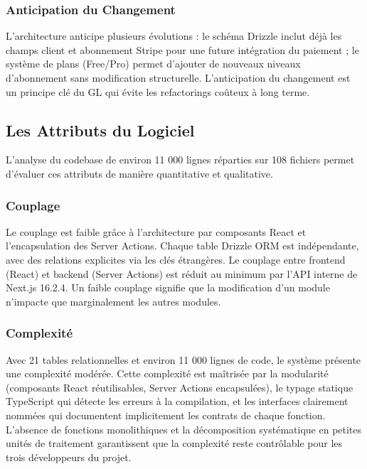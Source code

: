 \subsubsection{Anticipation du Changement}

L'architecture anticipe plusieurs évolutions : le schéma Drizzle inclut déjà les champs client et abonnement Stripe pour une future intégration du paiement ; le système de plans (Free/Pro) permet d'ajouter de nouveaux niveaux d'abonnement sans modification structurelle. L'anticipation du changement est un principe clé du GL qui évite les refactorings coûteux à long terme.

\subsection{Les Attributs du Logiciel}

L'analyse du codebase de environ 11 000 lignes réparties sur 108 fichiers permet d'évaluer ces attributs de manière quantitative et qualitative.

\subsubsection{Couplage}

Le couplage est faible grâce à l'architecture par composants React et l'encapsulation des Server Actions. Chaque table Drizzle ORM est indépendante, avec des relations explicites via les clés étrangères. Le couplage entre frontend (React) et backend (Server Actions) est réduit au minimum par l'API interne de Next.js 16.2.4. Un faible couplage signifie que la modification d'un module n'impacte que marginalement les autres modules.

\subsubsection{Complexité}

Avec 21 tables relationnelles et environ 11 000 lignes de code, le système présente une complexité modérée. Cette complexité est maîtrisée par la modularité (composants React réutilisables, Server Actions encapsulées), le typage statique TypeScript qui détecte les erreurs à la compilation, et les interfaces clairement nommées qui documentent implicitement les contrats de chaque fonction. L'absence de fonctions monolithiques et la décomposition systématique en petites unités de traitement garantissent que la complexité reste contrôlable pour les trois développeurs du projet.

